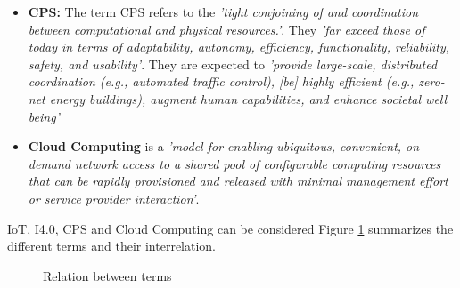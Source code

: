 \begin{itemize}
  \item \textbf{\acl{CPS}:} The term \ac{CPS} refers to the \emph{'tight conjoining of and coordination between computational and physical resources.'}. They \emph{'far exceed those of today in terms of adaptability, autonomy, efficiency, functionality, reliability, safety, and usability'}. They are expected to \emph{'provide large-scale, distributed coordination (e.g., automated traffic control), [be] highly efficient (e.g., zero-net energy buildings), augment human capabilities, and enhance societal well being'}  \cite{cps:nsf:2011}
  
  \item \textbf{Cloud Computing} is a \emph{'model for enabling ubiquitous, convenient, on-demand network access to a shared pool of configurable computing resources that can be rapidly provisioned and released with minimal management effort or service provider interaction'}\cite{Mell:2011:SND:2206223}.
\end{itemize}

\ac{IoT}, \ac{I4.0}, \ac{CPS} and Cloud Computing can be considered 
Figure \ref{fig:terms} summarizes the different terms and their interrelation.

\begin{figure}[H]
\centering
{}
\caption{Relation between terms} \label{fig:terms}
\end{figure}

